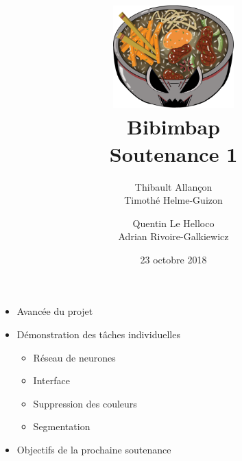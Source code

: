 \documentclass[14pt]{extarticle}
\title{
    {\protect\centering\protect\includegraphics[width=0.35\textwidth]{logo_bibimbap2.png}}\\
	{\large Bibimbap}\\
	{Soutenance 1}\\
}
\author{
	Thibault Allançon\\
	Timothé Helme-Guizon
	\and
	Quentin Le Helloco\\
	Adrian Rivoire-Galkiewicz
}
\date{23 octobre 2018}
\begin{document}
\maketitle
\vspace{2em}

\begin{itemize}
    \item Avancée du projet
    \item Démonstration des tâches individuelles
    \begin{itemize}
        \item Réseau de neurones
        \item Interface
        \item Suppression des couleurs
        \item Segmentation
    \end{itemize}
    \item Objectifs de la prochaine soutenance
\end{itemize}
\end{document}
